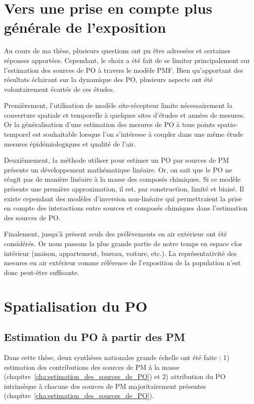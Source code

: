 
\section{Vers une prise en compte plus générale de l'exposition}

Au cours de ma thèse, plusieurs questions ont pu être adressées et certaines réponses
apportées.  Cependant, le choix a été fait de se limiter principalement sur l'estimation
des sources de PO à travers le modèle PMF. Bien qu'apportant des résultats éclairant sur
la dynamique des PO, plusieurs aspects ont été volontairement écartés de ces études.

Premièrement, l'utilisation de modèle site-récepteur limite nécessairement la couverture
spatiale et temporelle à quelques sites d'études et années de mesures. Or la
généralisation d'une estimation des mesures de PO à tous points spatio-temporel est
souhaitable lorsque l'on s'intéresse à coupler dans une même étude mesures
épidémiologiques et qualité de l'air.

Deuxièmement, la méthode utiliser pour estimer un PO par sources de PM présente un
développement mathématique linéaire. Or, on sait que le PO ne réagit pas de manière
linéaire à la masse des composés chimiques. Si ce modèle présente une première
approximation, il est, par construction, limité et biaisé.  Il existe cependant des
modèles d'inversion non-linéaire qui permettraient la prise en compte des interactions
entre sources et composés chimiques dans l'estimation des sources de PO.

Finalement, jusqu'à présent seuls des prélèvements en air extérieur ont été considérés. Or
nous passons la plus grande partie de notre temps en espace clos intérieur (maison,
appartement, bureau, voiture, etc.).  La représentativité des mesures en air extérieur
comme référence de l'exposition de la population n'est donc peut-être suffisante.

\section{Spatialisation du PO}

\subsection{Estimation du PO à partir des PM}

Dans cette thèse, deux synthèses nationales grande échelle ont été faite : 1) estimation
des contributions des sources de PM à la masse \autocite{weberComparison2019}
(chapitre~\ref{cha:estimation_des_sources_de_PO}) et 2) attribution du PO intrinsèque à
chacune des sources de PM majoritairement présentes \autocite{weberSourceinprep.}
(chapitre~\ref{cha:estimation_des_sources_de_PO}).

